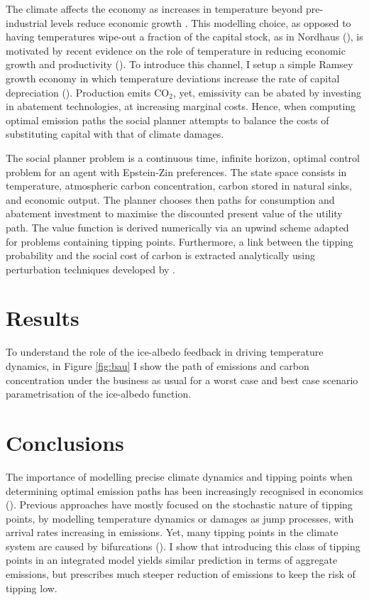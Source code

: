 \documentclass[12pt]{article}
\begin{document}
The climate affects the economy as increases in temperature beyond pre-industrial levels reduce economic growth \citep{pindyck_economic_2013, hambel_optimal_2021}. This modelling choice, as opposed to having temperatures wipe-out a fraction of the capital stock, as in Nordhaus (\citeyear{nordhaus_estimates_2014,nordhaus_question_2008,nordhaus_revisiting_2017}), is motivated by recent evidence on the role of temperature in reducing economic growth and productivity (\cite{burke_global_2015, dietz_growth_2019}). To introduce this channel, I setup a simple Ramsey growth economy in which temperature deviations increase the rate of capital depreciation (\cite{hambel_optimal_2021}). Production emits CO$_2$, yet, emissivity can be abated by investing in abatement technologies, at increasing marginal costs. Hence, when computing optimal emission paths the social planner attempts to balance the costs of substituting capital with that of climate damages.

The social planner problem is a continuous time, infinite horizon, optimal control problem for an agent with Epstein-Zin preferences. The state space consists in temperature, atmospheric carbon concentration, carbon stored in natural sinks, and economic output. The planner chooses then paths for consumption and abatement investment to maximise the discounted present value of the utility path. The value function is derived numerically via an upwind scheme adapted for problems containing tipping points. Furthermore, a link between the tipping probability and the social cost of carbon is extracted analytically using perturbation techniques developed by \cite{grass_small-noise_2015}.

\section{Results}

To understand the role of the ice-albedo feedback in driving temperature dynamics, in Figure \ref{fig:bau} I show the path of emissions and carbon concentration under the business as usual for a worst case and best case scenario parametrisation of the ice-albedo function. 

\section{Conclusions}


The importance of modelling precise climate dynamics and tipping points when determining optimal emission paths has been increasingly recognised in economics (\cite{van_den_bremer_risk-adjusted_2021,dietz_economic_2021,dietz_are_2020,taconet_social_2021,lontzek_stochastic_2015}). Previous approaches have mostly focused on the stochastic nature of tipping points, by modelling temperature dynamics or damages as jump processes, with arrival rates increasing in emissions. Yet, many tipping points in the climate system are caused by bifurcations (\cite{ashwin_extreme_2020,ashwin_tipping_2012}). I show that introducing this class of tipping points in an integrated model yields similar prediction in terms of aggregate emissions, but prescribes much steeper reduction of emissions to keep the risk of tipping low.
\end{document}
